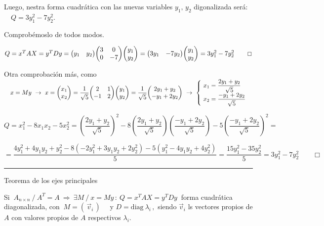 Luego, nestra forma cuadrática con las nuevas variables $y_1, \, y_2$ digonalizada será: $\quad Q=3y_1^2-7y_2^2$. 

Comprobémoslo de todos modos.

$Q=x^TAX=y^TDy=\mqty(y_1& y_2)\mqty(3&0\\0 &-7)\mqty(y_1\\y_2)=\mqty(3y_1&-7y_2)\mqty(y_1\\y_2)=3y_1^2-7y_2^2 \qquad \Box$



Otra comprobación más, como $ \quad x=My \ \to \  x=  \mqty(x_1 \\ x_2)= \dfrac 1{\sqrt{5}} \mqty(2&1\\-1&2) \mqty(y_1\\y_2) =  \dfrac 1{\sqrt{5}} \mqty( 2y_1+y_2 \\  -y_1+2y_2) \ \to \ \begin{cases} \ x_1= \dfrac{2y_1+y_2}{\sqrt{5}} \\ \ x_2=\dfrac{-y_1+2y_2}{\sqrt{5}} \end{cases}$

$Q=x_1^2-8x_1x_2-5x_2^2= \left( \dfrac{2y_1+y_2}{\sqrt{5}} \right)^2 - 8 \left( \dfrac{2y_1+y_2}{\sqrt{5}} \right) \left( \dfrac{-y_1+2y_2}{\sqrt{5}} \right)-5 \left( \dfrac{-y_1+2y_2}{\sqrt{5}} \right)^2=$

$=\dfrac{4y_1^2+4y_1y_2+y_2^2-8(-2y_1^2+3y_1y_2+2y_2^2)-5(y_1^2-4y_1y_2+4y_2^2)}{5}=\dfrac{15y_1^2-35y_2^2}{5}=3y_1^2-7y_2^2 \qquad \Box$

\begin{center}
	\rule{200pt}{0.1pt}
\end{center}

\color{black}

\vspace{15mm}
\begin{large}
\begin{myblock}{Teorema de los ejes principales}
\vspace{2mm}

Si $\ A_{n\times n} \ / \ A^T=A \ \Rightarrow \ \exists M \ / \ x=My \, : \ Q=x^TAX=y^TDy\ $ forma cuadrática diagonalizada, con $\ M=(\, \vec v_i \, ) \quad \text{ y } D=\text{diag}\ \lambda_i\, , $ siendo  $\vec v_i$ ls vectores propios de $A$ con valores propios de $A$ respectivos $\lambda_i$.

\vspace{2mm}	
\end{myblock}
\end{large}

